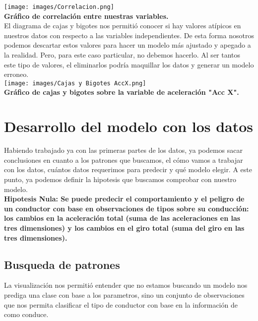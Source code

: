 \documentclass{article}
\begin{document}
        \texttt{[image: images/Correlacion.png]} \\

        \textbf{Gráfico de correlación entre nuestras variables.} \\
        
        El diagrama de cajas y bigotes nos permitió conocer si hay valores atípicos en nuestros datos con respecto a las variables independientes. De esta forma nosotros podemos descartar estos valores para hacer un modelo más ajustado y apegado a la realidad. Pero, para este caso particular, no debemos hacerlo. Al ser tantos este tipo de valores, el eliminarlos podría maquillar los datos y generar un modelo erroneo.\\

        \texttt{[image: images/Cajas y Bigotes AccX.png]} \\

        \textbf{Gráfico de cajas y bigotes sobre la variable de aceleración "Acc X".} \\

\section{Desarrollo del modelo con los datos}

Habiendo trabajado ya con las primeras partes de los datos, ya podemos sacar conclusiones en cuanto a los patrones que buscamos, el cómo vamos a trabajar con los datos, cuántos datos requerimos para predecir y qué modelo elegir. A este punto, ya podemos definir la hipotesis que buscamos comprobar con nuestro modelo. \\

    \textbf{Hipotesis Nula: Se puede predecir el comportamiento y el peligro de un conductor con base en observaciones de tipos sobre su conducción: los cambios en la aceleración total (suma de las aceleraciones en las tres dimensiones) y los cambios en el giro total (suma del giro en las tres dimensiones).} \\
        
    \subsection{Busqueda de patrones}

        La visualización nos permitió entender que no estamos buscando un modelo nos prediga una clase con base a los parametros, sino un conjunto de observaciones que nos permita clasificar el tipo de conductor con base en la información de como conduce. 
        
\end{document}
